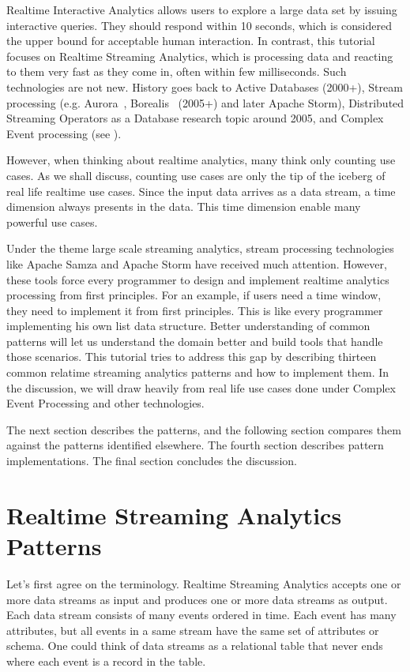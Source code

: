 \documentclass{sig-alternate}
\begin{document}
Realtime Interactive Analytics allows users to explore a large data set by issuing interactive queries. They should respond within 10 seconds, which is considered the upper bound for acceptable human interaction. In contrast, this tutorial focuses on Realtime Streaming Analytics, which is processing data and reacting to them very fast as they come in, often within few milliseconds. Such technologies are not new. History goes back to Active Databases (2000+), Stream processing (e.g. Aurora~\cite{abadi_aurora:_2003}, Borealis~\cite{abadi_design_2005} (2005+) and later Apache Storm), Distributed Streaming Operators as a Database research topic around 2005, and Complex Event processing (see \cite{marketSurvey}).

However, when thinking about realtime analytics, many think only counting use cases. As we shall discuss, counting use cases are only the tip of the iceberg of real life realtime use cases. Since the input data arrives as a data stream, a time dimension always presents in the data. This time dimension enable many powerful use cases.  

Under the theme large scale streaming analytics, stream processing technologies like Apache Samza and Apache Storm have received much attention. However, these tools force every programmer to design and implement realtime analytics processing from first principles. For an example, if users need a time window, they need to implement it from first principles.  This is like every programmer implementing his own list data structure. Better understanding of common patterns will let us understand the domain better and build tools that handle those scenarios. This tutorial tries to address this gap by describing thirteen common relatime streaming analytics patterns and how to implement them. In the discussion, we will draw heavily from real life use cases done under Complex Event Processing and other technologies. 

The next section describes the patterns, and the following  section compares them against the patterns identified elsewhere. The fourth section describes pattern implementations. The final section concludes the discussion. 

\section{Realtime Streaming Analytics Patterns}
 
Let's first agree on the terminology. Realtime Streaming Analytics accepts one or more data streams as input and produces one or more data streams as output. Each data stream consists of many events ordered in time. Each event has many attributes, but all events in a same stream have the same set of attributes or schema. One could think of data streams as a relational table that never ends where each event is a record in the table. 
\end{document}
